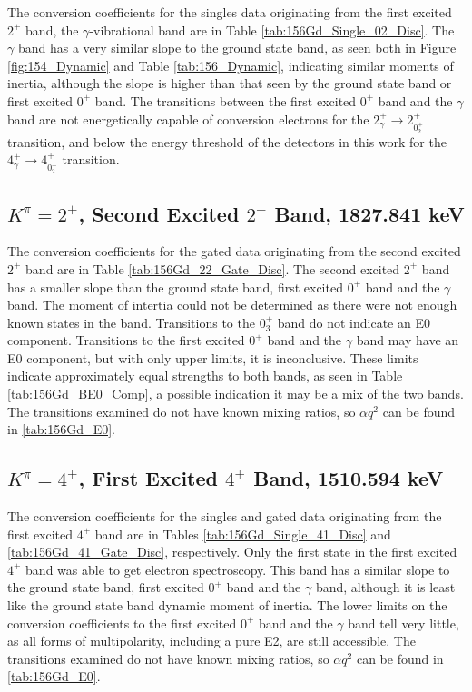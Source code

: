 The conversion coefficients for the singles data originating from the first excited $2^+$ band, the $\gamma$-vibrational band are in Table \ref{tab:156Gd_Single_02_Disc}. The $\gamma$ band has a very similar slope to the ground state band, as seen both in Figure \ref{fig:154_Dynamic} and Table \ref{tab:156_Dynamic}, indicating similar moments of inertia, although the slope is higher than that seen by the ground state band or first excited $0^+$ band. The transitions between the first excited $0^+$ band and the $\gamma$ band are not energetically capable of conversion electrons for the $2^+_{\gamma}\rightarrow 2^+_{0^+_2}$ transition, and below the energy threshold of the detectors in this work for the $4^+_{\gamma}\rightarrow 4^+_{0^+_2}$ transition.



\subsection{$K^{\pi}=2^+$, Second Excited $2^+$ Band, 1827.841 keV}

The conversion coefficients for the gated data originating from the second excited $2^+$ band are in Table \ref{tab:156Gd_22_Gate_Disc}. The second excited $2^+$ band has a smaller slope than the ground state band, first excited $0^+$ band and the $\gamma$ band. The moment of intertia could not be determined as there were not enough known states in the band. Transitions to the $0^+_3$ band do not indicate an E0 component. Transitions to the first excited $0^+$ band and the $\gamma$ band may have an E0 component, but with only upper limits, it is inconclusive. These limits indicate approximately equal strengths to both bands, as seen in Table \ref{tab:156Gd_BE0_Comp}, a possible indication it may be a mix of the two bands. The transitions examined do not have known mixing ratios, so $\alpha q^2$ can be found in \ref{tab:156Gd_E0}.



\subsection{$K^{\pi}=4^+$, First Excited $4^+$ Band, 1510.594 keV}

The conversion coefficients for the singles and gated data originating from the first excited $4^+$ band are in Tables \ref{tab:156Gd_Single_41_Disc} and \ref{tab:156Gd_41_Gate_Disc}, respectively. Only the first state in the first excited $4^+$ band was able to get electron spectroscopy. This band has a similar slope to the ground state band, first excited $0^+$ band and the $\gamma$ band, although it is least like the ground state band dynamic moment of inertia. The lower limits on the conversion coefficients to the first excited $0^+$ band and the $\gamma$ band tell very little, as all forms of multipolarity, including a pure E2, are still accessible. The transitions examined do not have known mixing ratios, so $\alpha q^2$ can be found in \ref{tab:156Gd_E0}.

